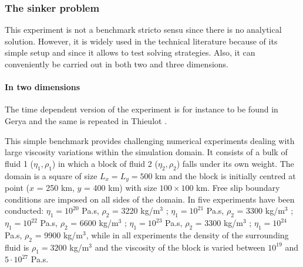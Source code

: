 \subsubsection{The sinker problem}\label{sec:sinker}

This experiment is not a benchmark stricto sensu since there is no analytical solution. However, it is widely used in the technical literature because of its simple setup and since it allows to test solving strategies.
Also, it can conveniently be carried out in both two and three dimensions.

\paragraph{In two dimensions} The time dependent version of the experiment is for instance to be found 
in Gerya \cite{gery10} and the same is repeated in Thieulot \cite{thie11}.

This simple benchmark provides challenging numerical experiments 
dealing with large viscosity variations within the simulation
domain. It consists of a bulk of fluid 1 ($\eta_1,\rho_1$) 
in which a block of fluid 2 ($\eta_2,\rho_2$) falls under its own
weight. The domain is a square of size $L_x = L_y = 500$ km and the
block is initially centred at point ($x$ = 250 km, $y$ = 400 km) with size
$100 \times 100$ km.
Free slip boundary conditions are imposed on all sides of the domain. 
In \cite{thie11} five experiments have been conducted:
$\eta_1 = 10^{20}$ Pa.s, $\rho_2$ = 3220 kg/m$^3$ ;
$\eta_1 = 10^{21}$ Pa.s, $\rho_2$ = 3300 kg/m$^3$ ;
$\eta_1 = 10^{22}$ Pa.s, $\rho_2$ = 6600 kg/m$^3$ ;
$\eta_1 = 10^{23}$ Pa.s, $\rho_2$ = 3300 kg/m$^3$ ;
$\eta_1 = 10^{24}$ Pa.s, $\rho_2$ = 9900 kg/m$^3$,
while in all experiments the density of the surrounding fluid is
$\rho_1=3200$ kg/m$^3$ and the viscosity of the block is varied between
$10^{19}$ and $5\cdot10^{27}$ Pa.s.

